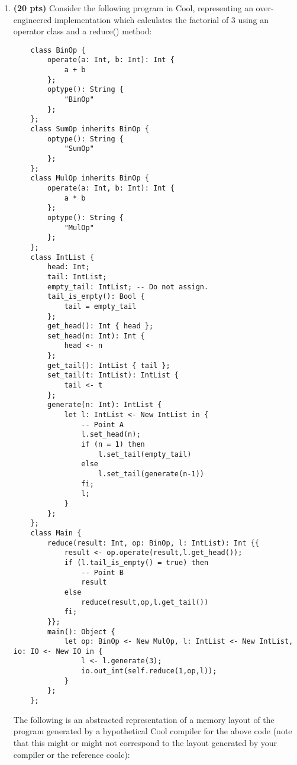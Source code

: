\documentclass[11pt]{article}
\begin{document}
\begin{enumerate}
  \item \textbf{(20 pts)} Consider the following program in Cool, representing an over-engineered implementation which calculates the factorial of 3 using an operator class and a reduce() method:
  \begin{lstlisting}
    class BinOp {
        operate(a: Int, b: Int): Int {
            a + b
        };
        optype(): String {
            "BinOp"
        };
    };
    class SumOp inherits BinOp { 
        optype(): String {
            "SumOp"
        };
    };
    class MulOp inherits BinOp {
        operate(a: Int, b: Int): Int {
            a * b
        };
        optype(): String {
            "MulOp"
        };
    };
    class IntList {
        head: Int;
        tail: IntList;
        empty_tail: IntList; -- Do not assign.
        tail_is_empty(): Bool {
            tail = empty_tail
        };
        get_head(): Int { head };
        set_head(n: Int): Int {
            head <- n
        };
        get_tail(): IntList { tail };
        set_tail(t: IntList): IntList {
            tail <- t
        };
        generate(n: Int): IntList {
            let l: IntList <- New IntList in {
                -- Point A
                l.set_head(n);
                if (n = 1) then
                    l.set_tail(empty_tail)
                else
                    l.set_tail(generate(n-1))
                fi;
                l;
            }
        };
    };
    class Main {
        reduce(result: Int, op: BinOp, l: IntList): Int {{
            result <- op.operate(result,l.get_head());
            if (l.tail_is_empty() = true) then
                -- Point B
                result
            else
                reduce(result,op,l.get_tail())
            fi;
        }};
        main(): Object {
            let op: BinOp <- New MulOp, l: IntList <- New IntList, io: IO <- New IO in {
                l <- l.generate(3); 
                io.out_int(self.reduce(1,op,l));
            }
        };
    };
  \end{lstlisting}
  
  The following is an abstracted representation of a memory layout of the program generated by a hypothetical Cool compiler for the above code (note that this might or might not correspond to the layout generated by your compiler or the reference coolc):
  

\end{enumerate}
\end{document}
